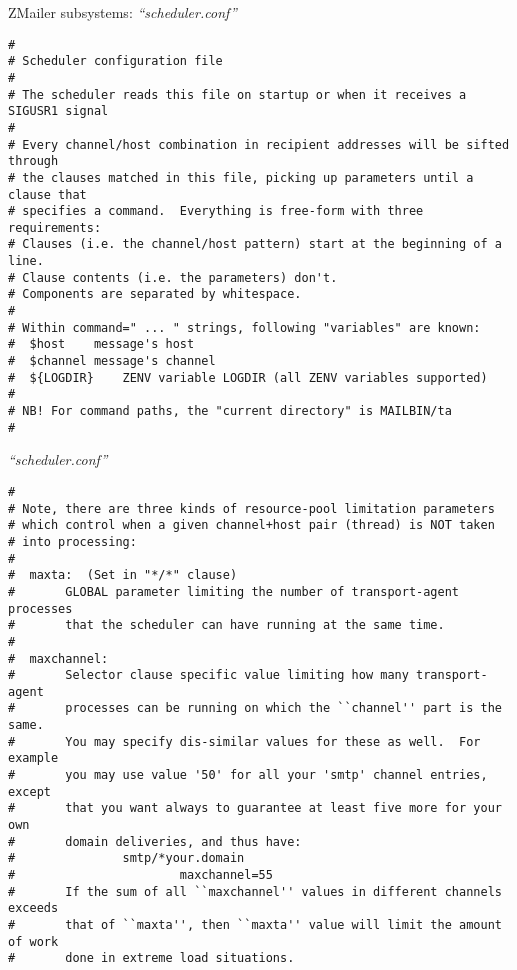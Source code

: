 \documentclass[a4paper,landscape]{slides}
\newcommand{\ZM}{ZMailer}
\begin{document}

\begin{overlay}

\centerline{\large \ZM{} subsystems: {\em ``scheduler.conf''}}

\tiny
\begin{verbatim}
#
# Scheduler configuration file
#
# The scheduler reads this file on startup or when it receives a SIGUSR1 signal
#
# Every channel/host combination in recipient addresses will be sifted through
# the clauses matched in this file, picking up parameters until a clause that
# specifies a command.  Everything is free-form with three requirements:
# Clauses (i.e. the channel/host pattern) start at the beginning of a line.
# Clause contents (i.e. the parameters) don't.
# Components are separated by whitespace.
# 
# Within command=" ... " strings, following "variables" are known:
#  $host	message's host
#  $channel	message's channel
#  ${LOGDIR}	ZENV variable LOGDIR (all ZENV variables supported)
#
# NB! For command paths, the "current directory" is MAILBIN/ta
#
\end{verbatim}
\vfill
\end{overlay}
\begin{overlay}
\small
\centerline{{\em ``scheduler.conf''}}
\tiny
\begin{verbatim}
#
# Note, there are three kinds of resource-pool limitation parameters
# which control when a given channel+host pair (thread) is NOT taken
# into processing:
#
#  maxta:  (Set in "*/*" clause)
#       GLOBAL parameter limiting the number of transport-agent processes
#       that the scheduler can have running at the same time.
#
#  maxchannel:
#       Selector clause specific value limiting how many transport-agent
#       processes can be running on which the ``channel'' part is the same.
#       You may specify dis-similar values for these as well.  For example
#       you may use value '50' for all your 'smtp' channel entries, except
#       that you want always to guarantee at least five more for your own
#       domain deliveries, and thus have:
#               smtp/*your.domain
#                       maxchannel=55
#       If the sum of all ``maxchannel'' values in different channels exceeds
#       that of ``maxta'', then ``maxta'' value will limit the amount of work
#       done in extreme load situations.
\end{verbatim}
\vfill
\end{overlay}
\end{document}
